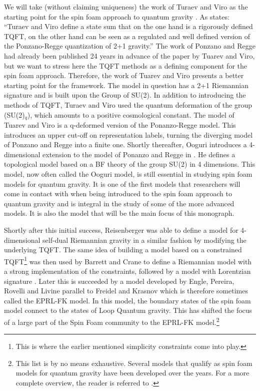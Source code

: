 We will take (without claiming uniqueness) the work of Turaev and Viro as the
starting point for the spin foam approach to quantum gravity
\cite{turaevStateSumInvariants1992}. As \cite{rovelliNotesBriefHistory2000}
states: ``Turaev and Viro define a state sum that on the one hand is a
rigorously defined TQFT, on the other hand can be seen as a regulated and well
defined version of the Ponzano-Regge quantization of 2+1 gravity.'' The work of
Ponzano and Regge \cite{ponanzaSemiclassicalLimitRacah1968} had already been
published 24 years in advance of the paper by Tuarev and Viro, but we want to
stress here the TQFT methods as a defining component for the spin foam
approach. Therefore, the work of Tuarev and Viro presents a better starting
point for the framework. The model in question has a 2+1 Riemannian signature
and is built upon the Group of SU(2). In addition to introducing the methods of
TQFT, Turaev and Viro used the quantum deformation of the group (SU(2)$_q$),
which amounts to a positive cosmological constant. The model of Tuarev and Viro
is a q-deformed version of the Ponanzo-Regge model. This introduces an upper
cut-off on representation labels, turning the diverging model of Ponzano and
Regge into a finite one. Shortly thereafter, Ooguri introduces a 4-dimensional
extension to the model of Ponanzo and Regge in
\cite{ooguriTopologicalLatticeModels1992}. He defines a topological model based
on a BF theory \cite{birminghamTopologicalFieldTheory1991} of the group SU(2)
in 4 dimensions. This model, now often called the Ooguri model, is still
essential in studying spin foam models for quantum gravity. It is one of the
first models that researchers will come in contact with when being introduced
to the spin foam approach to quantum gravity and is integral in the study of
some of the more advanced models. It is also the model that will be the main
focus of this monograph.

Shortly after this initial success, Reisenberger
\cite{reisenbergerWorldSheetFormulations1994}
was able to define a model for 4-dimensional self-dual Riemannian gravity in a
similar fashion by modifying the underlying TQFT. The same idea of building a
model based on a constrained TQFT\footnote{This is where the earlier mentioned
simplicity constraints come into play.} was then used by Barrett and Crane to
define a Riemannian model with a strong implementation of the constraints,
followed by a model with Lorentzian signature
\cite{barrettLorentzianSignatureModel2000}. Later this is succeeded by a model
developed by Engle, Pereira, Rovelli and Livine
\cite{engleLQGVertexFinite2008,livineConsistentlySolvingSimplicity2008,livineNewSpinfoamVertex2007}
parallel to Freidel and Krasnov \cite{freidelNewSpinFoam2008} which is
therefore sometimes called the EPRL-FK model. In this model, the boundary
states of the spin foam model connect to the states of Loop Quantum gravity.
This has shifted the focus of a large part of the Spin Foam community to the
EPRL-FK model.\footnote{This list is by no means exhaustive. Several models
that qualify as spin foam models for quantum gravity have been developed over
the years. For a more complete overview, the reader is referred to
\cite{perezSpinFoamApproach2012}.} 

